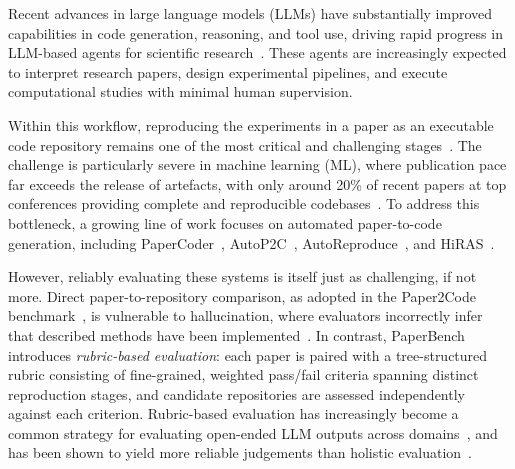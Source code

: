 \documentclass[11pt]{article}
\begin{document}
Recent advances in large language models (LLMs) have substantially improved capabilities in code generation, reasoning, and tool use, driving rapid progress in LLM-based agents for scientific research~\cite{zhao2025autoreproduceautomaticaiexperiment,yuan-etal-2025-dolphin,yamada2025aiscientistv2workshoplevelautomated,lyu2026evoscientistmultiagentevolvingai}. These agents are increasingly expected to interpret research papers, design experimental pipelines, and execute computational studies with minimal human supervision.

Within this workflow, reproducing the experiments in a paper as an executable code repository remains one of the most critical and challenging stages~\cite{zhu2025aiscientistsfailstrong}. The challenge is particularly severe in machine learning (ML), where publication pace far exceeds the release of artefacts, with only around 20\% of recent papers at top conferences providing complete and reproducible codebases~\cite{doi:10.1142/S0218194022500358,magnusson-etal-2023-reproducibility,seo2025paper2codeautomatingcodegeneration}. To address this bottleneck, a growing line of work focuses on automated paper-to-code generation, including PaperCoder~\cite{seo2025paper2codeautomatingcodegeneration}, AutoP2C~\cite{lin2025autop2cllmbasedagentframework}, AutoReproduce~\cite{zhao2025autoreproduceautomaticaiexperiment}, and HiRAS~\cite{hong2026hirashierarchicalmultiagentframework}.

However, reliably evaluating these systems is itself just as challenging, if not more. Direct paper-to-repository comparison, as adopted in the Paper2Code benchmark~\cite{seo2025paper2codeautomatingcodegeneration}, is vulnerable to hallucination, where evaluators incorrectly infer that described methods have been implemented~\cite{hong2026hirashierarchicalmultiagentframework}. In contrast, PaperBench~\cite{starace2025paperbenchevaluatingaisability} introduces \emph{rubric-based evaluation}: each paper is paired with a tree-structured rubric consisting of fine-grained, weighted pass/fail criteria spanning distinct reproduction stages, and candidate repositories are assessed independently against each criterion. Rubric-based evaluation has increasingly become a common strategy for evaluating open-ended LLM outputs across domains~\cite{wang2025profbenchmultidomainrubricsrequiring,arora2025healthbenchevaluatinglargelanguage,sharma2025researchrubricsbenchmarkpromptsrubrics}, and has been shown to yield more reliable judgements than holistic evaluation~\cite{zhou-etal-2026-rubricbench}.
\end{document}
